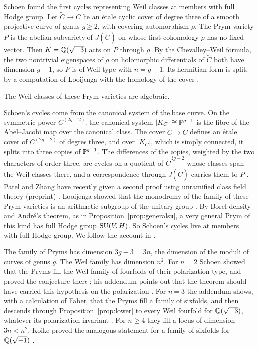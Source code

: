 Schoen found the first cycles representing Weil classes at members with
full Hodge group. Let $\widetilde C\to C$ be an \'etale cyclic cover of degree
three of a smooth projective curve of genus $g\ge2$, with covering
automorphism $\rho$. The Prym variety $P$ is the abelian subvariety of
$J(\widetilde C)$ on whose first cohomology $\rho$ has no fixed vector.
Then $K=\mathbb{Q}(\sqrt{-3})$ acts on $P$ through $\rho$. By the
Chevalley--Weil formula, the two nontrivial eigenspaces of $\rho$ on
holomorphic differentials of $\widetilde C$ both have dimension $g-1$, so $P$
is of Weil type with $n=g-1$. Its hermitian form is split, by a computation
of Looijenga with the homology of the cover \cite{Loo97}.

\begin{theorem}\label{thm:schoen}
The Weil classes of these Prym varieties are algebraic.
\end{theorem}

Schoen's cycles come from the canonical system of the base curve. On the
symmetric power $C^{(2g-2)}$, the canonical system $|K_{C}|\cong\mathbb{P}^{g-1}$ is
the fibre of the Abel--Jacobi map over the canonical class. The cover
$\widetilde C\to C$ defines an \'etale cover of $C^{(2g-2)}$ of degree three,
and over $|K_{C}|$, which is simply connected, it splits into three copies of
$\mathbb{P}^{g-1}$. The differences of the copies, weighted by the two characters of
order three, are cycles on a quotient of $\widetilde C^{\,2g-2}$ whose classes
span the Weil classes there, and a correspondence through $J(\widetilde C)$
carries them to $P$ \cite[Theorem~2.0 with $r=0$, Corollary~3.1]{Sch88}. Patel and Zhang have recently given a second proof using unramified class
field theory (preprint) \cite{PZ25}. Looijenga showed that the monodromy of
the family of these Prym varieties is an arithmetic subgroup of the
unitary group \cite{Loo97}. By Borel density and Andr\'e's theorem, as in
Proposition~\ref{prop:generalsu}, a very general Prym of this kind has full
Hodge group $\operatorname{SU}(V,H)$. So Schoen's cycles live at members with full Hodge
group. We follow the account in \cite{BhH8}.

The family of Pryms has dimension $3g-3=3n$, the dimension of the moduli of
curves of genus $g$. The Weil family has dimension $n^{2}$. For $n=2$ Schoen
showed that the Pryms fill the Weil family of fourfolds of their polarization
type, and proved the conjecture there \cite[Theorem~3.2]{Sch88}; his addendum
points out that the theorem should have carried this hypothesis on the
polarization \cite{Sch98}. For $n=3$ the addendum shows, with a calculation of
Faber, that the Pryms fill a family of sixfolds, and then descends through
Proposition~\ref{prop:lower} to every Weil fourfold for $\mathbb{Q}(\sqrt{-3})$,
whatever its polarization invariant \cite{Sch98}.
For $n\ge4$ they fill a locus of dimension $3n<n^{2}$. Koike proved the
analogous statement for a family of sixfolds for $\mathbb{Q}(\sqrt{-1})$
\cite{Koi04}.

